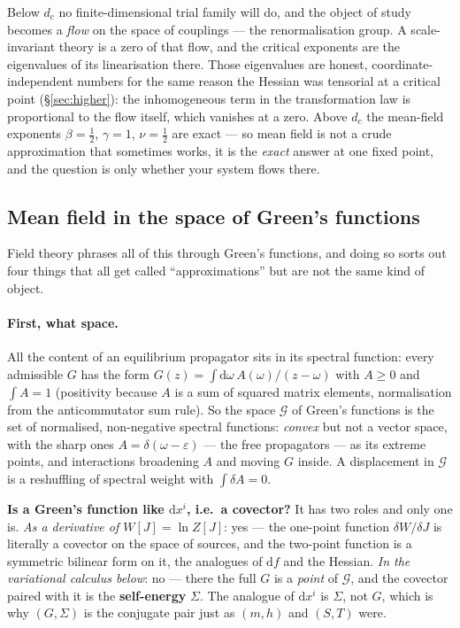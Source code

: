 \documentclass[10pt,a4paper]{article}
\newcommand{\dd}{\mathrm{d}}
\theoremstyle{plain}
\theoremstyle{definition}
\numberwithin{equation}{section}
\begin{document}
Below $d_c$ no finite-dimensional trial family will do, and the object of study becomes a
\emph{flow} on the space of couplings --- the renormalisation group. A scale-invariant theory is
a zero of that flow, and the critical exponents are the eigenvalues of its linearisation there.
Those eigenvalues are honest, coordinate-independent numbers for the same reason the Hessian was
tensorial at a critical point (\S\ref{sec:higher}): the inhomogeneous term in the transformation
law is proportional to the flow itself, which vanishes at a zero. Above $d_c$ the mean-field
exponents $\beta=\tfrac12$, $\gamma=1$, $\nu=\tfrac12$ are exact --- so mean field is not a
crude approximation that sometimes works, it is the \emph{exact} answer at one fixed point, and
the question is only whether your system flows there.

\subsection{Mean field in the space of Green's functions}
\label{sec:mfgreen}

Field theory phrases all of this through Green's functions, and doing so sorts out four things
that all get called ``approximations'' but are not the same kind of object.

\paragraph{First, what space.} All the content of an equilibrium propagator sits in its spectral
function: every admissible $G$ has the form
$G(z)=\int\dd\omega\,A(\omega)/(z-\omega)$ with $A\ge0$ and $\int A=1$ (positivity because $A$
is a sum of squared matrix elements, normalisation from the anticommutator sum rule). So the
space $\mathcal G$ of Green's functions is the set of normalised, non-negative spectral
functions: \emph{convex} but not a vector space, with the sharp ones
$A=\delta(\omega-\varepsilon)$ --- the free propagators --- as its extreme points, and
interactions broadening $A$ and moving $G$ inside. A displacement in $\mathcal G$ is a
reshuffling of spectral weight with $\int\delta A=0$.

\begin{keybox}
\textbf{Is a Green's function like $\dd x^i$, i.e.\ a covector?} It has two roles and only one
is. \emph{As a derivative of $W[J]=\ln Z[J]$}: yes --- the one-point function $\delta W/\delta J$
is literally a covector on the space of sources, and the two-point function is a symmetric
bilinear form on it, the analogues of $\dd f$ and the Hessian. \emph{In the variational calculus
below}: no --- there the full $G$ is a \emph{point} of $\mathcal G$, and the covector paired with
it is the \textbf{self-energy} $\Sigma$. The analogue of $\dd x^i$ is $\Sigma$, not $G$, which
is why $(G,\Sigma)$ is the conjugate pair just as $(m,h)$ and $(S,T)$ were.
\end{keybox}
\end{document}
